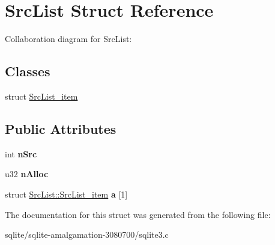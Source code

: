 \hypertarget{struct_src_list}{\section{Src\+List Struct Reference}
\label{struct_src_list}
}


Collaboration diagram for Src\+List\+:
\subsection*{Classes}
\begin{DoxyCompactItemize}
\item 
struct \hyperlink{struct_src_list_1_1_src_list__item}{Src\+List\+\_\+item}
\end{DoxyCompactItemize}
\subsection*{Public Attributes}
\begin{DoxyCompactItemize}
\item 
\hypertarget{struct_src_list_a8ecf9cced910877d93210ace66365ec8}{int {\bfseries n\+Src}}\label{struct_src_list_a8ecf9cced910877d93210ace66365ec8}

\item 
\hypertarget{struct_src_list_ab9c572bef9144ab245f7f46bc5b82a61}{u32 {\bfseries n\+Alloc}}\label{struct_src_list_ab9c572bef9144ab245f7f46bc5b82a61}

\item 
\hypertarget{struct_src_list_acd181938f7144b40022b28072247aa3d}{struct \hyperlink{struct_src_list_1_1_src_list__item}{Src\+List\+::\+Src\+List\+\_\+item} {\bfseries a} \mbox{[}1\mbox{]}}\label{struct_src_list_acd181938f7144b40022b28072247aa3d}

\end{DoxyCompactItemize}


The documentation for this struct was generated from the following file\+:\begin{DoxyCompactItemize}
\item 
sqlite/sqlite-\/amalgamation-\/3080700/sqlite3.\+c\end{DoxyCompactItemize}
